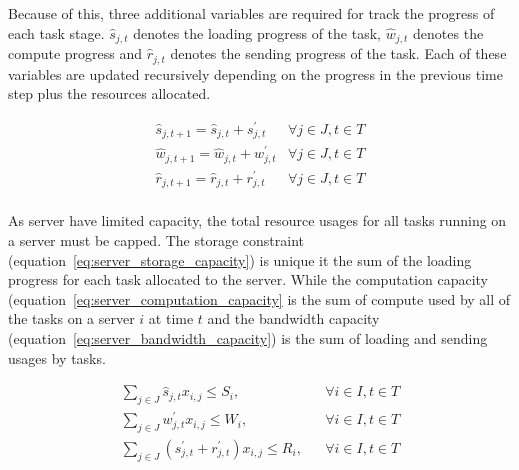 Because of this, three additional variables are required for track the progress of each task stage.
$\hat{s}_{j,t}$ denotes the loading progress of the task, $\hat{w}_{j,t}$ denotes the compute progress and
$\hat{r}_{j,t}$ denotes the sending progress of the task. Each of these variables are updated recursively depending
on the progress in the previous time step plus the resources allocated.

\begin{align}
    \hat{s}_{j,t+1} = \hat{s}_{j,t} + s^{'}_{j,t} & \forall {j \in J, t \in T } \label{eq:loading_progress} \\
    \hat{w}_{j,t+1} = \hat{w}_{j,t} + w^{'}_{j,t} & \forall {j \in J, t \in T } \label{eq:compute_progress} \\
    \hat{r}_{j,t+1} = \hat{r}_{j,t} + r^{'}_{j,t} & \forall {j \in J, t \in T } \label{eq:sending_progress} \\
\end{align}


As server have limited capacity, the total resource usages for all tasks running on a server must be capped.
The storage constraint (equation~\eqref{eq:server_storage_capacity}) is unique it the sum of the loading progress for
each task allocated to the server. While the computation capacity
(equation~\eqref{eq:server_computation_capacity} is the sum of compute used by all of the tasks on a server $i$ at
time $t$ and the bandwidth capacity (equation~\eqref{eq:server_bandwidth_capacity}) is the sum of loading and sending
usages by tasks.

\begin{align}
    \sum_{j \in J} \hat{s}_{j,t} x_{i,j} \leq S_i, && \forall{i \in I, t \in T} \label{eq:server_storage_capacity} \\
    \sum_{j \in J} w^{'}_{j,t} x_{i,j} \leq W_i, && \forall{i \in I, t \in T} \label{eq:server_computation_capacity} \\
    \sum_{j \in J} (s^{'}_{j,t} + r^{'}_{j,t}) x_{i,j} \leq R_i, && \forall{i \in I, t \in T} \label{eq:server_bandwidth_capacity} \\
\end{align}

